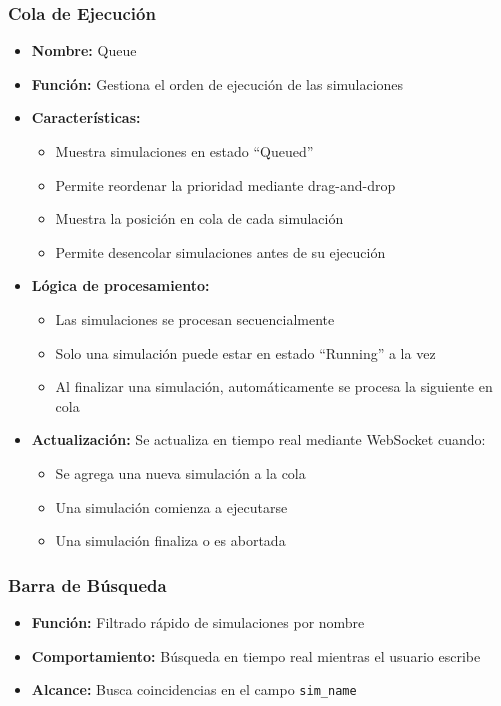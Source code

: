 \subsubsection{Cola de Ejecución}
\begin{itemize}
    \item \textbf{Nombre:} Queue
    \item \textbf{Función:} Gestiona el orden de ejecución de las simulaciones
    \item \textbf{Características:}
    \begin{itemize}
        \item Muestra simulaciones en estado ``Queued''
        \item Permite reordenar la prioridad mediante drag-and-drop
        \item Muestra la posición en cola de cada simulación
        \item Permite desencolar simulaciones antes de su ejecución
    \end{itemize}
    \item \textbf{Lógica de procesamiento:}
    \begin{itemize}
        \item Las simulaciones se procesan secuencialmente
        \item Solo una simulación puede estar en estado ``Running'' a la vez
        \item Al finalizar una simulación, automáticamente se procesa la siguiente en cola
    \end{itemize}
    \item \textbf{Actualización:} Se actualiza en tiempo real mediante WebSocket cuando:
    \begin{itemize}
        \item Se agrega una nueva simulación a la cola
        \item Una simulación comienza a ejecutarse
        \item Una simulación finaliza o es abortada
    \end{itemize}
\end{itemize}

\subsubsection{Barra de Búsqueda}
\begin{itemize}
    \item \textbf{Función:} Filtrado rápido de simulaciones por nombre
    \item \textbf{Comportamiento:} Búsqueda en tiempo real mientras el usuario escribe
    \item \textbf{Alcance:} Busca coincidencias en el campo \texttt{sim\_name}
\end{itemize}


